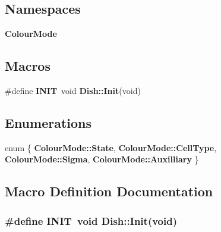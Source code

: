 \subsection*{Namespaces}
\begin{DoxyCompactItemize}
\item 
{\bf Colour\-Mode}
\end{DoxyCompactItemize}
\subsection*{Macros}
\begin{DoxyCompactItemize}
\item 
\#define {\bf I\-N\-I\-T}~void {\bf Dish\-::\-Init}(void)
\end{DoxyCompactItemize}
\subsection*{Enumerations}
\begin{DoxyCompactItemize}
\item 
enum \{ {\bf Colour\-Mode\-::\-State}, 
{\bf Colour\-Mode\-::\-Cell\-Type}, 
{\bf Colour\-Mode\-::\-Sigma}, 
{\bf Colour\-Mode\-::\-Auxilliary}
 \}
\end{DoxyCompactItemize}


\subsection{Macro Definition Documentation}
\subsubsection[{I\-N\-I\-T}]{\setlength{\rightskip}{0pt plus 5cm}\#define I\-N\-I\-T~void {\bf Dish\-::\-Init}(void)}\label{dish_8h_ab5889105dcd019008c9448dff61323f6}
